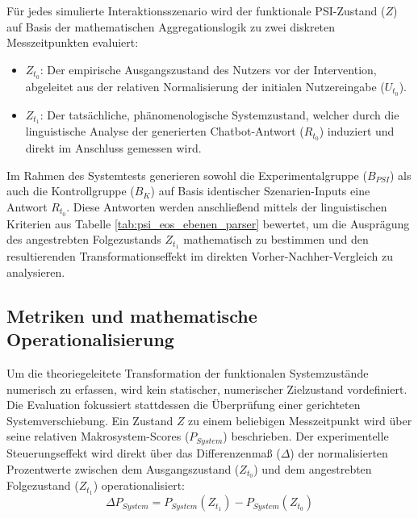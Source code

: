 Für jedes simulierte Interaktionsszenario wird der funktionale PSI-Zustand ($Z$) auf Basis der mathematischen Aggregationslogik zu zwei diskreten Messzeitpunkten evaluiert:
\begin{itemize}
    \item $Z_{t_0}$: Der empirische Ausgangszustand des Nutzers vor der Intervention, abgeleitet aus der relativen Normalisierung der initialen Nutzereingabe ($U_{t_0}$).
    \item $Z_{t_1}$: Der tatsächliche, phänomenologische Systemzustand, welcher durch die linguistische Analyse der generierten Chatbot-Antwort ($R_{t_0}$) induziert und direkt im Anschluss gemessen wird.
\end{itemize}

Im Rahmen des Systemtests generieren sowohl die Experimentalgruppe ($B_{PSI}$) als auch die Kontrollgruppe ($B_{K}$) auf Basis identischer Szenarien-Inputs eine Antwort $R_{t_0}$. Diese Antworten werden anschließend mittels der linguistischen Kriterien aus Tabelle \ref{tab:psi_eos_ebenen_parser} bewertet, um die Ausprägung des angestrebten Folgezustands $Z_{t_1}$ mathematisch zu bestimmen und den resultierenden Transformationseffekt im direkten Vorher-Nachher-Vergleich zu analysieren.

\subsection{Metriken und mathematische Operationalisierung}
Um die theoriegeleitete Transformation der funktionalen Systemzustände numerisch zu erfassen, wird kein statischer, numerischer Zielzustand vordefiniert. Die Evaluation fokussiert stattdessen die Überprüfung einer gerichteten Systemverschiebung. Ein Zustand $Z$ zu einem beliebigen Messzeitpunkt wird über seine relativen Makrosystem-Scores ($P_{System}$) beschrieben.
Der experimentelle Steuerungseffekt wird direkt über das Differenzenmaß ($\Delta$) der normalisierten Prozentwerte zwischen dem Ausgangszustand ($Z_{t_0}$) und dem angestrebten Folgezustand ($Z_{t_1}$) operationalisiert:
\begin{equation}
    \Delta P_{System} = P_{System}(Z_{t_1}) - P_{System}(Z_{t_0})
\end{equation}

